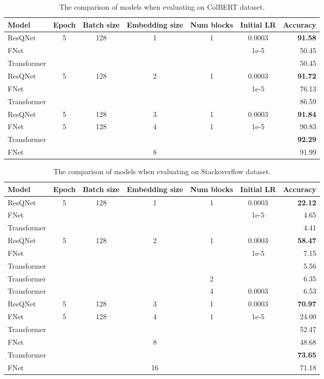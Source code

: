 \begin{table*}[htb!]
    \centering
    \begin{tabular}{ |l|c|c|c|c|c|r|  }
        \hline
        Model & Epoch & Batch size & Embedding size & Num blocks & Initial LR & Accuracy \\
        \hline
        ResQNet & 5 & 128 & 1 & 1 & 0.0003 & \textbf{91.58} \\
        FNet & & & & & 1e-5 & 50.45 \\
        Transformer & & & & & & 50.45 \\
        \hline
        ResQNet & 5 & 128 & 2 & 1 & 0.0003 & \textbf{91.72} \\
        FNet & & & & & 1e-5 & 76.13 \\
        Transformer & & & & & & 86.59 \\
        \hline
        ResQNet & 5 & 128 & 3 & 1 & 0.0003 & \textbf{91.84} \\
        \hline
        FNet & 5 & 128 & 4 & 1 & 1e-5 & 90.83 \\
        Transformer & & & & & & \textbf{92.29} \\
        FNet & & & 8 & & & 91.99 \\
        \hline
    \end{tabular}
    \caption{The comparison of models when evaluating on ColBERT dataset.}
    \label{table:colbert_result}
\end{table*}

\begin{table*}[htb!]
    \centering
    \begin{tabular}{ |l|c|c|c|c|c|r|  }
        \hline
        Model & Epoch & Batch size & Embedding size & Num blocks & Initial LR & Accuracy \\
        \hline
        ResQNet & 5 & 128 & 1 & 1 & 0.0003 & \textbf{22.12}\\
        FNet & & & & & 1e-5 & 4.65\\
        Transformer & & & & & & 4.41\\
        \hline
        ResQNet & 5 & 128 & 2 & 1 & 0.0003 & \textbf{58.47} \\
        FNet & & & & & 1e-5 & 7.15 \\
        Transformer & & & & & & 5.56 \\
        Transformer & & & & 2 & & 6.35 \\
        Transformer & & & & 4 & 0.0003 & 6.53 \\
        \hline
        ResQNet & 5 & 128 & 3 & 1 & 0.0003 & \textbf{70.97} \\
        \hline
        FNet & 5 & 128 & 4 & 1 & 1e-5 & 24.00 \\
        Transformer & & & & & & 52.47 \\
        FNet & & & 8 & & & 48.68 \\
        Transformer & & & & & & \textbf{73.65} \\
        FNet & & & 16 & & & 71.18 \\
        \hline
    \end{tabular}
    \caption{The comparison of models when evaluating on Stackoverflow dataset.}
    \label{table:stackoverflow_result}
\end{table*}

